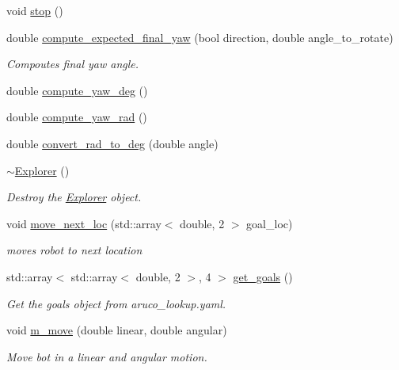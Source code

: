 \begin{DoxyCompactItemize}
void \hyperlink{class_explorer_a0e4a623ff30d1886cc9f57ec081c527f}{stop} ()
\item 
double \hyperlink{class_explorer_a02c37b93448ed474f1bf0d03e2758ca2}{compute\+\_\+expected\+\_\+final\+\_\+yaw} (bool direction, double angle\+\_\+to\+\_\+rotate)
\begin{DoxyCompactList}\small\item\em Compoutes final yaw angle. \end{DoxyCompactList}\item 
double \hyperlink{class_explorer_a670cdffdb8c3173c300590cfc45ab6d2}{compute\+\_\+yaw\+\_\+deg} ()
\item 
double \hyperlink{class_explorer_ac5b91cd64189a60ffe62535cb5bc093a}{compute\+\_\+yaw\+\_\+rad} ()
\item 
double \hyperlink{class_explorer_ac3a5c9368647dd9d2c36d12497bd889e}{convert\+\_\+rad\+\_\+to\+\_\+deg} (double angle)
\item 
\hyperlink{class_explorer_aa1b0a71e92e003e9162a5ba99d843392}{$\sim$\+Explorer} ()
\begin{DoxyCompactList}\small\item\em Destroy the \hyperlink{class_explorer}{Explorer} object. \end{DoxyCompactList}\item 
void \hyperlink{class_explorer_a2b0c1e46e1a17e99f4156edf5a93b691}{move\+\_\+next\+\_\+loc} (std\+::array$<$ double, 2 $>$ goal\+\_\+loc)
\begin{DoxyCompactList}\small\item\em moves robot to next location \end{DoxyCompactList}\item 
std\+::array$<$ std\+::array$<$ double, 2 $>$, 4 $>$ \hyperlink{class_explorer_a847e3ad2e7233d493a8dcfdd7139cb58}{get\+\_\+goals} ()
\begin{DoxyCompactList}\small\item\em Get the goals object from aruco\+\_\+lookup.\+yaml. \end{DoxyCompactList}\item 
void \hyperlink{class_explorer_ace304ef65547f4a3ff6458d934c54e87}{m\+\_\+move} (double linear, double angular)
\begin{DoxyCompactList}\small\item\em Move bot in a linear and angular motion. \end{DoxyCompactList}\end{DoxyCompactItemize}
